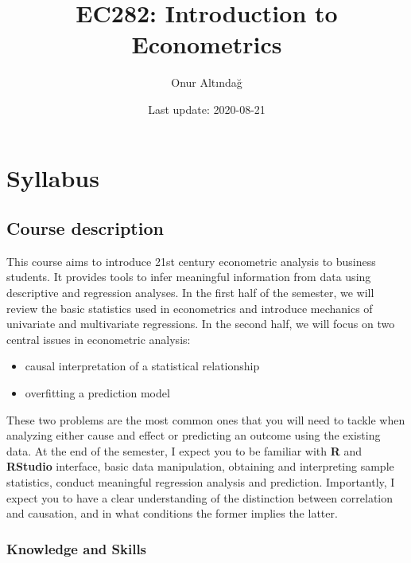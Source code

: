 \documentclass[
]{book}
\title{EC282: Introduction to Econometrics}
\author{Onur Altındağ}
\date{Last update: 2020-08-21}
\providecommand{\tightlist}{%
  \setlength{\itemsep}{0pt}\setlength{\parskip}{0pt}}
\begin{document}
\maketitle

{
\setcounter{tocdepth}{1}
\tableofcontents
}
\hypertarget{syllabus}{%
\chapter*{Syllabus}\label{syllabus}}

\hypertarget{course-desctiption}{%
\section*{Course description}\label{course-desctiption}}

This course aims to introduce 21st century econometric analysis to business students. It provides tools to infer meaningful information from data using descriptive and regression analyses. In the first half of the semester, we will review the basic statistics used in econometrics and introduce mechanics of univariate and multivariate regressions. In the second half, we will focus on two central issues in econometric analysis:

\begin{itemize}
\tightlist
\item
  causal interpretation of a statistical relationship
\item
  overfitting a prediction model
\end{itemize}

These two problems are the most common ones that you will need to tackle when analyzing either cause and effect or predicting an outcome using the existing data. At the end of the semester, I expect you to be familiar with \textbf{R} and \textbf{RStudio} interface, basic data manipulation, obtaining and interpreting sample statistics, conduct meaningful regression analysis and prediction. Importantly, I expect you to have a clear understanding of the distinction between correlation and causation, and in what conditions the former implies the latter.

\hypertarget{knowledge}{%
\subsection*{Knowledge and Skills}\label{knowledge}}
\end{document}
